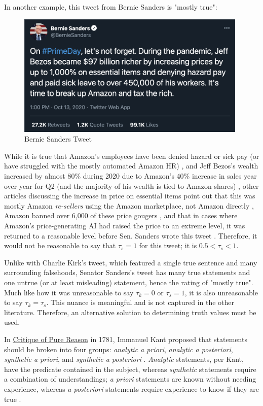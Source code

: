 \documentclass[NETN,manuscript]{stjour-new}
\begin{document}
In another example, this tweet from Bernie Sanders is "mostly true": 
 \begin{figure}[htp]
    \centering
    \includegraphics[width=11cm]{BernieTweet.png}
    \caption{Bernie Sanders Tweet}
    \label{fig:Bernie Sanders Tweet, Oct 13, 2020}
\end{figure}

While it is true that Amazon's employees have been denied hazard or sick pay (or have struggled with the mostly automated Amazon HR) \citep{cnbc2020amazon,guardian2020amazon}, and Jeff Bezos's wealth increased by almost 80\% during 2020 due to Amazon's 40\% increase in sales year over year for Q2 (and the majority of his wealth is tied to Amazon shares) \citep{Stebbins2020bezos}, other articles discussing the increase in price on essential items point out that this was mostly Amazon \textit{re-sellers} using the Amazon marketplace, not Amazon directly \citep{nicas2020sanitizer, kim2020price,gibson2020amazon}, Amazon banned over 6,000 of these price gougers \citep{bezos2020letter}, and that in cases where Amazon's price-generating AI had raised the price to an extreme level, it was returned to a reasonable level before Sen. Sanders wrote this tweet \citep{harman2020prime}. Therefore, it would not be reasonable to say that $\tau_s = 1$ for this tweet; it is $ 0.5 < \tau_s < 1$. 

Unlike with Charlie Kirk's tweet, which featured a single true sentence and many surrounding falsehoods, Senator Sanders's tweet has many true statements and one untrue (or at least misleading) statement, hence the rating of "mostly true". Much like how it was unreasonable to say $\tau_k = 0$ or $\tau_s = 1$, it is also unreasonable to say $\tau_k = \tau_s$. This nuance is meaningful and is not captured in the other literature. Therefore, an alternative solution to determining truth values must be used.

In \underline{Critique of Pure Reason} in 1781, Immanuel Kant proposed that statements should be broken into four groups: \textit{analytic a priori}, \textit{analytic a posteriori}, \textit{synthetic a priori}, and \textit{synthetic a posteriori} \citep{kant1908critique,frege1988collected,quine1951main}. \textit{Analytic} statements, per Kant, have the predicate contained in the subject, whereas \textit{synthetic} statements require a combination of understandings; \textit{a priori} statements are known without needing experience, whereas \textit{a posteriori} statements require experience to know if they are true \citep{wright1997companion}.
\end{document}
